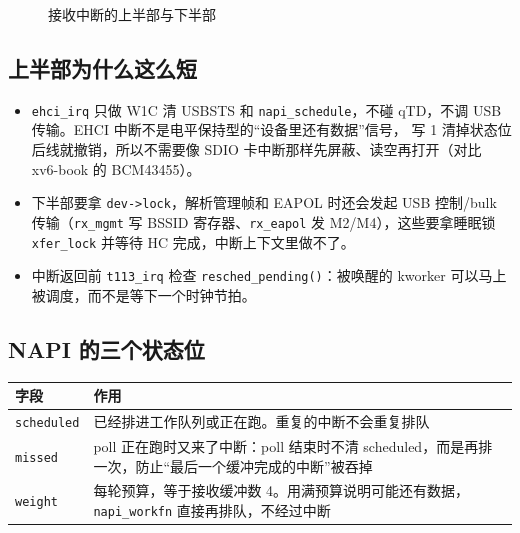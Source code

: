 \documentclass[UTF8,zihao=-4,fontset=none]{ctexart}
\newcommand{\fn}[1]{\texttt{#1}}
\begin{document}
\begin{figure}[H]
\caption{接收中断的上半部与下半部}
\end{figure}

\subsection{上半部为什么这么短}

\begin{itemize}[leftmargin=2em,itemsep=0pt]
\item \fn{ehci\_irq} 只做 W1C 清 USBSTS 和 \fn{napi\_schedule}，不碰 qTD，不调 USB 传输。EHCI 中断不是电平保持型的“设备里还有数据”信号，
  写 1 清掉状态位后线就撤销，所以不需要像 SDIO 卡中断那样先屏蔽、读空再打开（对比 xv6-book 的 BCM43455）。
\item 下半部要拿 \fn{dev->lock}，解析管理帧和 EAPOL 时还会发起 USB 控制/bulk 传输（\fn{rx\_mgmt} 写 BSSID 寄存器、\fn{rx\_eapol} 发 M2/M4），这些要拿睡眠锁 \fn{xfer\_lock} 并等待 HC 完成，中断上下文里做不了。
\item 中断返回前 \fn{t113\_irq} 检查 \fn{resched\_pending()}：被唤醒的 kworker 可以马上被调度，而不是等下一个时钟节拍。
\end{itemize}

\subsection{NAPI 的三个状态位}

\begin{longtable}{p{24mm}p{124mm}}
\toprule
字段 & 作用 \\ \midrule \endhead
\fn{scheduled} & 已经排进工作队列或正在跑。重复的中断不会重复排队 \\
\fn{missed} & poll 正在跑时又来了中断：poll 结束时不清 scheduled，而是再排一次，防止“最后一个缓冲完成的中断”被吞掉 \\
\fn{weight} & 每轮预算，等于接收缓冲数 4。用满预算说明可能还有数据，\fn{napi\_workfn} 直接再排队，不经过中断 \\
\bottomrule
\end{longtable}
\end{document}
